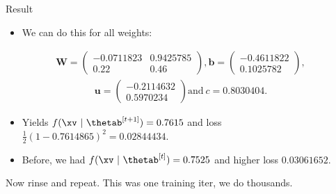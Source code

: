 \begin{vbframe}{Result}
  \begin{itemize}
    \item We can do this for all weights:
  \end{itemize}
  \begin{eqnarray*}
    \textbf{W} = \begin{pmatrix}
    \num[round-mode=places,round-precision=4]{-0.0711823} & \num[round-mode=places,round-precision=4]{0.9425785} \\
    0.22 & 0.46
    \end{pmatrix},
    \textbf{b} = \begin{pmatrix}
    \num[round-mode=places,round-precision=4]{-0.4611822} \\
    \num[round-mode=places,round-precision=4]{0.1025782}
    \end{pmatrix},
  \end{eqnarray*}
  \begin{eqnarray*}
    \textbf{u} = \begin{pmatrix}
    \num[round-mode=places,round-precision=4]{-0.2114632} \\
    \num[round-mode=places,round-precision=4]{0.5970234}
    \end{pmatrix}
    \text{and} \ c = \num[round-mode=places,round-precision=4]{0.8030404}\text{.}
  \end{eqnarray*}

  \begin{itemize}
    \item Yields $f(\xv ~|~\thetab^{[t+1]}) = \num[round-mode=places,round-precision=4]{0.7614865}$ and loss 
        $\frac{1}{2}(1 - \num[round-mode=places,round-precision=4]{0.7614865})^2 = \num[round-mode=places,round-precision=4]{0.02844434}.$
    \item Before, we had $f(\xv ~|~\thetab^{[t]}) = \num[round-mode=places,round-precision=4]{0.7525469}$ and higher loss $\num[round-mode=places,round-precision=4]{0.03061652}$.

  \end{itemize}
\lz
 Now rinse and repeat. This was one training iter, we do thousands.
\end{vbframe}


